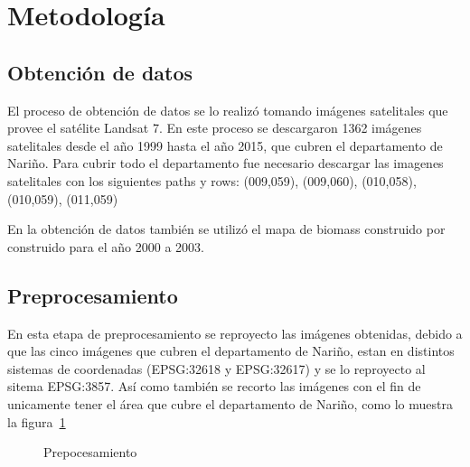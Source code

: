  
\section{Metodología}

\subsection{Obtención de datos}

El proceso de obtención de datos se lo realizó tomando imágenes satelitales que provee el satélite
Landsat 7. En este proceso se descargaron 1362 imágenes satelitales desde el año 1999 hasta el año 2015, que cubren el 
departamento de Nariño. Para cubrir todo el departamento fue necesario descargar las imagenes satelitales con 
los siguientes paths y rows: (009,059), (009,060), (010,058), (010,059), (011,059) 

En la obtención de datos también se utilizó el mapa de biomass construido por \cite{baccini2012estimated} 
construido para el año 2000 a 2003.


\subsection{Preprocesamiento}

En esta etapa de preprocesamiento se reproyecto las imágenes obtenidas, debido a que las cinco imágenes
que cubren el departamento de Nariño, estan en distintos sistemas de coordenadas (EPSG:32618 y EPSG:32617) y se 
lo reproyecto al sitema EPSG:3857. Así como también se recorto las imágenes con el fin de unicamente tener 
el área que cubre el departamento de Nariño, como lo muestra la figura~\ref{fig:Recortar imágenes}

\begin{figure}
  \centering
  \vfill
  \caption{Prepocesamiento}
  \label{fig:Recortar imágenes}
\end{figure}


